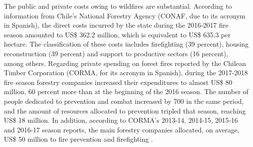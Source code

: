 \documentclass[11pt]{article}
\begin{document}
\begin{spacing}{1.5}



The public and private costs owing to wildfires are substantial.  According to information from Chile's National Forestry Agency (CONAF, due to its acronym in Spanish), the direct costs incurred by the state during the 2016-2017 fire season amounted to US\$ 362.2 million, which is equivalent to US\$ 635.3 per hectare. The classification of these costs includes firefighting (39 percent), housing reconstruction (39 percent) and support to productive sectors (16 percent), among others. Regarding private spending on forest fires reported by the Chilean Timber Corporation (CORMA, for its acronym in Spanish), during the 2017-2018 fire season forestry companies increased their expenditures to almost US\$ 80 million, 60 percent more than at the beginning of the 2016 season. The number of people dedicated to prevention and combat increased by 700 in the same period, and the amount of resources allocated to prevention tripled that season, reaching US\$ 18 million. In addition, according to CORMA's 2013-14, 2014-15, 2015-16 and 2016-17 season reports, the main forestry companies allocated, on average, US\$ 50 million to fire prevention and firefighting \citep{CR2}.



\end{spacing}
\end{document}
